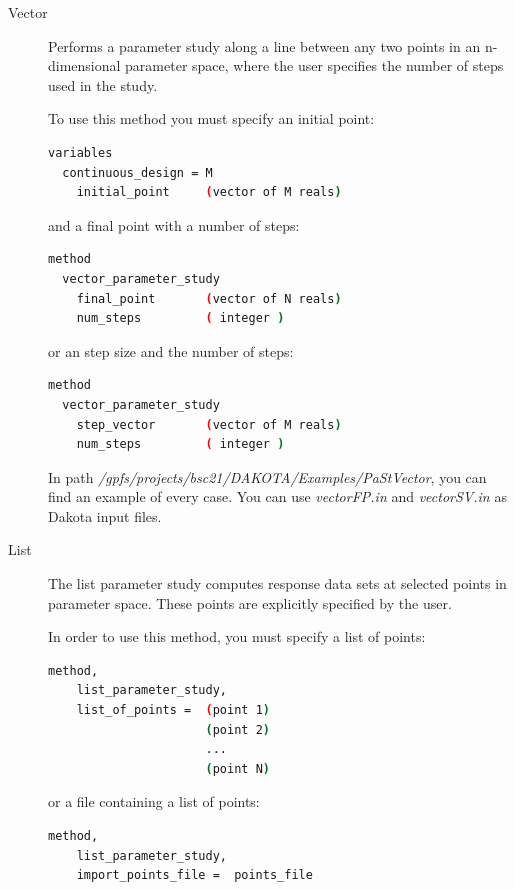 \documentclass[12pt,a4paper,article]{memoir}
\begin{document}
\begin{description}
\item[Vector] Performs a parameter study along a line between any two points in an n-dimensional parameter space, where the user specifies the number of steps used in the study.

To use this method you must specify an initial point:

\begin{lstlisting}[style=MyCodeStyle,language=bash]
variables
  continuous_design = M
    initial_point     (vector of M reals)
\end{lstlisting}

and a final point with a number of steps:

\begin{lstlisting}[style=MyCodeStyle,language=bash]
method
  vector_parameter_study
    final_point       (vector of N reals)
    num_steps         ( integer )
\end{lstlisting}

or an step size and the number of steps:

\begin{lstlisting}[style=MyCodeStyle,language=bash]
method
  vector_parameter_study
    step_vector       (vector of M reals)
    num_steps         ( integer )
\end{lstlisting}

In path \textit{/gpfs/projects/bsc21/DAKOTA/Examples/PaStVector}, you can find an example of every case. You can use \textit{vectorFP.in} and \textit{vectorSV.in} as Dakota input files.

\item[List] The list parameter study computes response data sets at selected points in parameter space. These points are explicitly specified by the user.

In order to use this method, you must specify a list of points:

\begin{lstlisting}[style=MyCodeStyle,language=bash]
method,
	list_parameter_study,
	list_of_points =  (point 1)
	                  (point 2)
	                  ...
	                  (point N)
\end{lstlisting}

or a file containing a list of points:

\begin{lstlisting}[style=MyCodeStyle,language=bash]
method,
	list_parameter_study,
	import_points_file =  points_file
\end{lstlisting}


\end{description}
\end{document}
